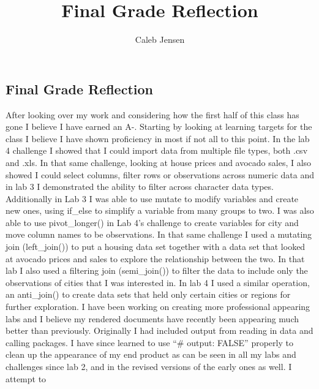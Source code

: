\documentclass[
  letterpaper,
  DIV=11,
  numbers=noendperiod]{scrartcl}
\title{Final Grade Reflection}
\author{Caleb Jensen}
\date{}
\begin{document}
\maketitle
\ifdefined\Shaded\renewenvironment{Shaded}{\begin{tcolorbox}[interior hidden, enhanced, frame hidden, boxrule=0pt, borderline west={3pt}{0pt}{shadecolor}, breakable, sharp corners]}{\end{tcolorbox}}\fi

\hypertarget{final-grade-reflection}{%
\subsection{Final Grade Reflection}\label{final-grade-reflection}}

After looking over my work and considering how the first half of this
class has gone I believe I have earned an A-. Starting by looking at
learning targets for the class I believe I have shown proficiency in
most if not all to this point. In the lab 4 challenge I showed that I
could import data from multiple file types, both .csv and .xls. In that
same challenge, looking at house prices and avocado sales, I also showed
I could select columns, filter rows or observations across numeric data
and in lab 3 I demonstrated the ability to filter across character data
types. Additionally in Lab 3 I was able to use mutate to modify
variables and create new ones, using if\_else to simplify a variable
from many groups to two. I was also able to use pivot\_longer() in Lab
4's challenge to create variables for city and move column names to be
observations. In that same challenge I used a mutating join
(left\_join()) to put a housing data set together with a data set that
looked at avocado prices and sales to explore the relationship between
the two. In that lab I also used a filtering join (semi\_join()) to
filter the data to include only the observations of cities that I was
interested in. In lab 4 I used a similar operation, an anti\_join() to
create data sets that held only certain cities or regions for further
exploration. I have been working on creating more professional appearing
labs and I believe my rendered documents have recently been appearing
much better than previously. Originally I had included output from
reading in data and calling packages. I have since learned to use
``\#\textbar{} output: FALSE'' properly to clean up the appearance of my
end product as can be seen in all my labs and challenges since lab 2,
and in the revised versions of the early ones as well. I attempt to
\end{document}
